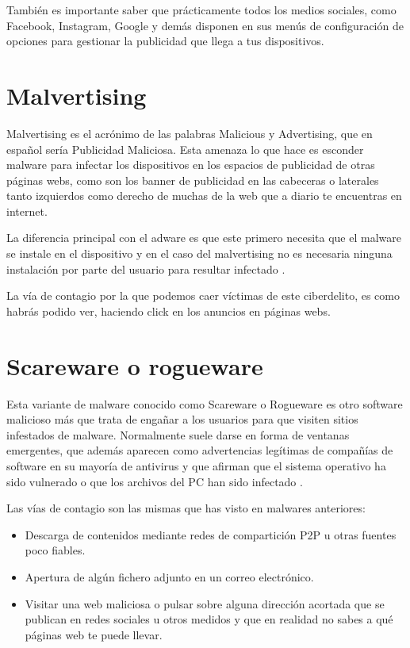 \documentclass[
  spanish,
  a4paper,
  openany]{book}
\begin{document}
También es importante saber que prácticamente todos los medios sociales, como Facebook, Instagram, Google y demás disponen en sus menús de configuración de opciones para gestionar la publicidad que llega a tus dispositivos.

\hypertarget{malvertising}{%
\section{Malvertising}\label{malvertising}}

Malvertising es el acrónimo de las palabras Malicious y Advertising, que en español sería Publicidad Maliciosa. Esta amenaza lo que hace es esconder malware para infectar los dispositivos en los espacios de publicidad de otras páginas webs, como son los banner de publicidad en las cabeceras o laterales tanto izquierdos como derecho de muchas de la web que a diario te encuentras en internet.

La diferencia principal con el adware es que este primero necesita que el malware se instale en el dispositivo y en el caso del malvertising no es necesaria ninguna instalación por parte del usuario para resultar infectado \citep{OSI-malvertising}.

La vía de contagio por la que podemos caer víctimas de este ciberdelito, es como habrás podido ver, haciendo click en los anuncios en páginas webs.

\hypertarget{scareware-o-rogueware}{%
\section{Scareware o rogueware}\label{scareware-o-rogueware}}

Esta variante de malware conocido como Scareware o Rogueware es otro software malicioso más que trata de engañar a los usuarios para que visiten sitios infestados de malware. Normalmente suele darse en forma de ventanas emergentes, que además aparecen como advertencias legítimas de compañías de software en su mayoría de antivirus y que afirman que el sistema operativo ha sido vulnerado o que los archivos del PC han sido infectado \citep{KASPER-scareware}.

Las vías de contagio son las mismas que has visto en malwares anteriores:

\begin{itemize}
\item
  Descarga de contenidos mediante redes de compartición P2P u otras fuentes poco fiables.
\item
  Apertura de algún fichero adjunto en un correo electrónico.
\item
  Visitar una web maliciosa o pulsar sobre alguna dirección acortada que se publican en redes sociales u otros medidos y que en realidad no sabes a qué páginas web te puede llevar.
\end{itemize}
\end{document}
